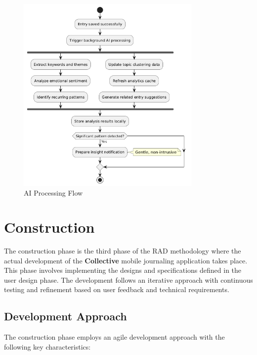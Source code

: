 \begin{figure}[H]
\centering
\includegraphics[width=0.8\textwidth]{files/imgs/ai_processing_flow.png}
\caption{AI Processing Flow}
\label{fig:ai-processing-flow}
\end{figure}
\clearpage

\section{Construction}\label{sec:construction}

The construction phase is the third phase of the RAD methodology where the actual development of the \textbf{Collective} mobile journaling application takes place. This phase involves implementing the designs and specifications defined in the user design phase. The development follows an iterative approach with continuous testing and refinement based on user feedback and technical requirements.

\subsection{Development Approach}\label{subsec:developmentApproach}

The construction phase employs an agile development approach with the following key characteristics:

